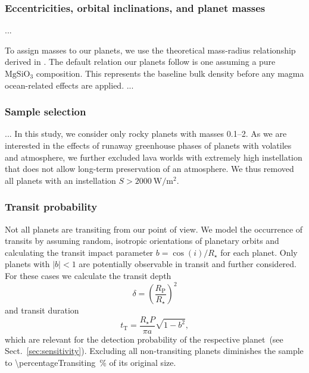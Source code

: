 \documentclass[modern]{aastex631}
\begin{document}
\subsubsection{Eccentricities, orbital inclinations, and planet masses}

...

To assign masses to our planets, we use the theoretical mass-radius relationship derived in \citet{Zeng2016}.
The default relation our planets follow is one assuming a pure $\mathrm{MgSiO_3}$ composition.
This represents the baseline bulk density before any magma ocean-related effects are applied.
...

\subsubsection{Sample selection}
\begin{note}
    ...
    In this study, we consider only rocky planets with masses \SIrange{0.1}{2}{\Mearth}. %
    As we are interested in the effects of runaway greenhouse phases of planets with volatiles and atmosphere, we further excluded lava worlds with extremely high instellation that does not allow long-term preservation of an atmosphere.
    We thus removed all planets with an instellation $S > \SI{2000}{\watt\per\square\meter}$.
\end{note}


\subsubsection{Transit probability}
\begin{note}
    Not all planets are transiting from our point of view.
    We model the occurrence of transits by assuming random, isotropic orientations of planetary orbits and calculating the transit impact parameter $b = \cos(i)/R_\star$ for each planet.
    Only planets with $|b| < 1$ are potentially observable in transit and further considered.
    For these cases we calculate the transit depth
    \begin{equation}\label{eq:transitdepth}
        \delta = \left( \frac{R_\mathrm{P}}{R_\star} \right)^2
    \end{equation}
    and transit duration
    \begin{equation}\label{eq:transitduration}
        t_{\mathrm{T}} = \frac{R_\star P}{\pi a} \sqrt{1 - b^2},
    \end{equation}
    which are relevant for the detection probability of the respective planet~(see Sect.~\ref{sec:sensitivity}).
    Excluding all non-transiting planets diminishes the sample to \SI{\percentageTransiting}{\percent} of its original size.
\end{note}
\end{document}
